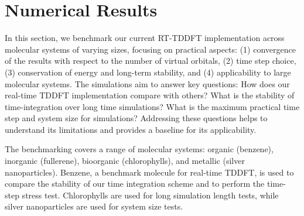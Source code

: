 \documentclass[journal=jctcce,manuscript=article,etalmode=truncate,maxauthors=10,layout=twocolumn,9pt]{achemso}   %
\begin{document}
\section{Numerical Results}
\label{sec:results}


In this section, we benchmark our current RT-TDDFT implementation across molecular systems of varying sizes, focusing on practical aspects: (1) convergence of the results with respect to the number of virtual orbitals, (2) time step choice, (3) conservation of energy and long-term stability, and (4) applicability to large molecular systems. The simulations aim to answer key questions: How does our real-time TDDFT implementation compare with others? What is the stability of time-integration over long time simulations? What is the maximum practical time step and system size for simulations? Addressing these questions helps to understand its limitations and provides a baseline for its applicability.



The benchmarking covers a range of molecular systems: organic (benzene), inorganic (fullerene), bioorganic (chlorophylls), and metallic (silver nanoparticles). Benzene, a benchmark molecule for real-time TDDFT, is used to compare the stability of our time integration scheme and to perform the time-step stress test. Chlorophylls are used for long simulation length tests, while silver nanoparticles are used for system size tests.
\end{document}
